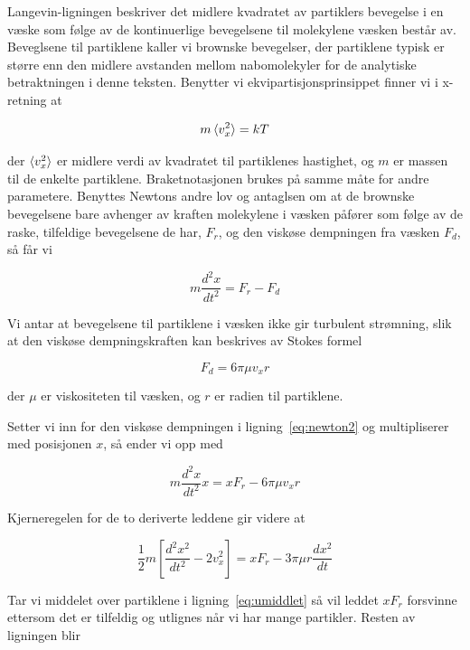 \documentclass[a4paper,11pt, twocolumn]{article}
\begin{document}
Langevin-ligningen beskriver det midlere kvadratet av partiklers bevegelse i en væske som følge av de kontinuerlige bevegelsene til molekylene væsken består av. Beveglsene til partiklene kaller vi brownske bevegelser, der partiklene typisk er større enn den midlere avstanden mellom nabomolekyler for de analytiske betraktningen i denne teksten. Benytter vi ekvipartisjonsprinsippet finner vi i x-retning at  

\begin{equation}
	m\braket{v_x^2} = kT
	\label{eq:kinetic}
\end{equation}

der $\braket{v_x^2}$ er midlere verdi av kvadratet til partiklenes hastighet, og $m$ er massen til de enkelte partiklene. Braketnotasjonen brukes på samme måte for andre parametere. Benyttes Newtons andre lov og antaglsen om at de brownske bevegelsene bare avhenger av kraften molekylene i væsken påfører som følge av de raske, tilfeldige bevegelsene de har, $F_r$, og den viskøse dempningen fra væsken $F_d$, så får vi

\begin{equation}
	m\frac{d^2x}{dt^2}=F_r-F_d
	\label{eq:newton2}
\end{equation}

Vi antar at bevegelsene til partiklene i væsken ikke gir turbulent strømning, slik at den viskøse dempningskraften kan beskrives av Stokes formel

\begin{equation}
	F_d = 6\pi\mu v_x r
	\label{eq:stokes}
\end{equation}

der $\mu$ er viskositeten til væsken, og $r$ er radien til partiklene. 

Setter vi inn for den viskøse dempningen i ligning~\eqref{eq:newton2} og multipliserer med posisjonen $x$, så ender vi opp med

\begin{equation}
	m\frac{d^2x}{dt^2}x={xF_r-6\pi\mu v_xr}	
\end{equation}

Kjerneregelen for de to deriverte leddene  gir videre at

\begin{equation}
	\frac{1}{2}m\left[ \frac{d^2x^2}{dt^2}	-2v_x^2 \right ] = xF_r - 3\pi\mu r\frac{dx^2}{dt}
	\label{eq:umiddlet}
\end{equation}

Tar vi middelet over partiklene i ligning~\eqref{eq:umiddlet} så vil leddet $xF_r$ forsvinne ettersom det er tilfeldig og utlignes når vi har mange partikler. Resten av ligningen blir
\end{document}
